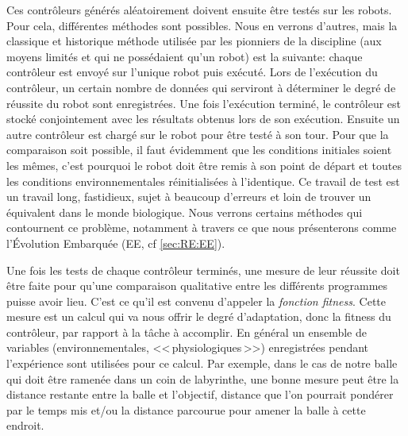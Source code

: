 \begin{inparaenum}[(\itshape 1\upshape)]
 \item Ces contrôleurs générés aléatoirement doivent ensuite être testés sur les robots. Pour cela, différentes méthodes sont possibles. Nous en verrons d'autres, mais la classique et historique méthode utilisée par les pionniers de la discipline (aux moyens limités et qui ne possédaient qu'un robot) est la suivante: chaque contrôleur est envoyé sur l'unique robot puis exécuté. Lors de l'exécution du contrôleur, un certain nombre de données qui serviront à déterminer le degré de réussite du robot sont enregistrées. Une fois l'exécution terminé, le contrôleur est stocké conjointement avec les résultats obtenus lors de son exécution. Ensuite un autre contrôleur est chargé sur le robot pour être testé à son tour. Pour que la comparaison soit possible, il faut évidemment que les conditions initiales soient les mêmes, c'est pourquoi le robot doit être remis à son point de départ et toutes les conditions environnementales réinitialisées à l'identique. Ce travail de test est un travail long, fastidieux, sujet à beaucoup d'erreurs et loin de trouver un équivalent dans le monde biologique. Nous verrons certains méthodes qui contournent ce problème, notamment à travers ce que nous présenterons comme l'Évolution Embarquée (EE, cf \ref{sec:RE:EE}). \label{it:test}

 \item Une fois les tests de chaque contrôleur terminés, une mesure de leur réussite doit être faite pour qu'une comparaison qualitative entre les différents programmes puisse avoir lieu. C'est ce qu'il est convenu d'appeler la \emph{fonction fitness}. Cette mesure est un calcul qui va nous offrir le degré d'adaptation, donc la fitness du contrôleur, par rapport à la tâche à accomplir. En général un ensemble de variables (environnementales, <<\,physiologiques\,>>) enregistrées pendant l'expérience sont utilisées pour ce calcul. Par exemple, dans le cas de notre balle qui doit être ramenée dans un coin de labyrinthe, une bonne mesure peut être la distance restante entre la balle et l'objectif, distance que l'on pourrait pondérer par le temps mis et/ou la distance parcourue pour amener la balle à cette endroit. \label{it:fitness}


\end{inparaenum}
